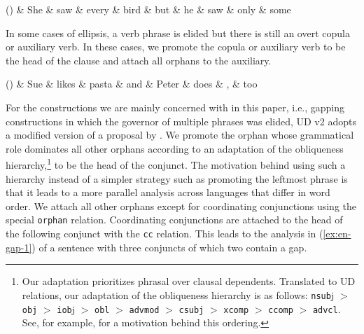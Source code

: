 \documentclass[11pt]{article}
\newenvironment{myquote}%
  {\list{}{\leftmargin=0.0in\rightmargin=0.0in}\item[]}%
  {\endlist}
\newcounter{excounter}
\begin{document}
\begin{myquote}
  \label{ex:nom-ellipsis}
  \footnotesize
  \begin{dependency}[edge unit distance=2.5ex]
    \begin{deptext}[column sep=0.1cm]
      (\theexcounter) \& She \& saw \& every \& bird \& but \& he \& saw \& only \& some \\
    \end{deptext}
  \end{dependency}
\end{myquote}

In some cases of ellipsis, a verb phrase is elided but there is still an overt copula or auxiliary 
verb. In these cases, we promote the copula or auxiliary verb to be the head of the clause 
and attach all orphans to the auxiliary.

\begin{myquote}
  \label{ex:vp-ellipsis}
  \footnotesize
  \begin{dependency}[edge unit distance=2.5ex]
    \begin{deptext}[column sep=0.2cm]
      (\theexcounter) \& Sue \& likes \& pasta \& and \& Peter \& does \& , \& too  \\
    \end{deptext}
  \end{dependency}
\end{myquote}

For the constructions we are mainly concerned with in this paper, i.e., gapping 
constructions in which the governor of multiple phrases was elided, UD v2 adopts 
a modified version of a proposal by . We promote the orphan 
whose grammatical role dominates all other orphans according to an adaptation of the 
obliqueness hierarchy,\footnote{
Our adaptation prioritizes phrasal over clausal dependents. 
Translated to UD relations, our adaptation of the obliqueness 
hierarchy is as follows: \texttt{nsub}j $>$ \texttt{obj} $>$ \texttt{iob}j $>$ \texttt{obl} $>$ 
\texttt{advmod} $>$ \texttt{csubj} $>$ \texttt{xcomp} $>$ \texttt{ccomp} $>$ \texttt{advcl}. 
See, for example,  for a motivation behind this ordering.} to be the 
head of the conjunct. The motivation behind using such a hierarchy instead of 
a simpler strategy such as promoting the leftmost phrase is that it leads 
to a more parallel analysis across languages that differ in word order.
We attach all other orphans except for coordinating conjunctions 
using the special \texttt{orphan} relation. Coordinating conjunctions are attached to the 
head of the following conjunct with the \texttt{cc} relation. This leads to the analysis 
in (\ref{ex:en-gap-1}) of a sentence with three conjuncts of which two contain a gap.
\end{document}
